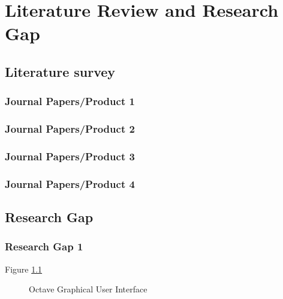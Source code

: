 \chapter{Literature Review and Research Gap}

\section{Literature survey}

\lipsum[1-1]

\subsection{Journal Papers/Product 1}

\lipsum[2-2]

\subsection{Journal Papers/Product 2}

\lipsum[3-3]

\subsection{Journal Papers/Product 3}

\lipsum[4-4]

\subsection{Journal Papers/Product 4}

\lipsum[5-5]

\section{Research Gap}

\subsection{Research Gap 1}
Figure \ref{OctaveGui} \lipsum[4-4]
\begin{figure}[H]	
	\centering
	\caption{Octave Graphical User Interface}
	\label{OctaveGui}
\end{figure}

